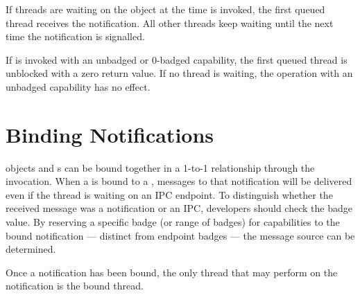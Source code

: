 If threads are waiting on the  object at the time
 is invoked, the first queued thread
receives the notification. All other threads keep waiting until the
next time the notification is signalled. 

If  is invoked with an unbadged or 0-badged
capability, the first queued thread is unblocked with a zero return value. If
no thread is waiting, the  operation with
an unbadged capability has no effect.


\section{Binding Notifications}
\label{sec:notification-binding}

 objects and s can be bound together in a 1-to-1 relationship
through the  invocation. When a
 is bound to a , messages to that notification
will be delivered even if the thread is waiting on an IPC
endpoint. To distinguish whether the received message was a notification
or an IPC, developers should check the badge value. By reserving a
specific badge (or range of badges) for capabilities to the bound
notification --- distinct from endpoint badges --- the
message source can be determined.

Once a notification has been bound, the only thread that may perform
 on the notification is the bound thread.
